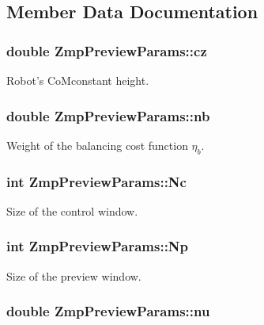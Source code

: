 \subsection{\-Member \-Data \-Documentation}
\hypertarget{structZmpPreviewParams_a4bddbdd99f911c9dddfcb2445da1b7dc}{
\subsubsection[{cz}]{\setlength{\rightskip}{0pt plus 5cm}double {\bf \-Zmp\-Preview\-Params\-::cz}}}\label{structZmpPreviewParams_a4bddbdd99f911c9dddfcb2445da1b7dc}
\-Robot's \-Co\-Mconstant height. \hypertarget{structZmpPreviewParams_abaa39df27b9d8993a940e753b297dcea}{
\subsubsection[{nb}]{\setlength{\rightskip}{0pt plus 5cm}double {\bf \-Zmp\-Preview\-Params\-::nb}}}\label{structZmpPreviewParams_abaa39df27b9d8993a940e753b297dcea}
\-Weight of the balancing cost function $ \eta_b $. \hypertarget{structZmpPreviewParams_adf022d12c133e9a17a41c1a9864fdef0}{
\subsubsection[{\-Nc}]{\setlength{\rightskip}{0pt plus 5cm}int {\bf \-Zmp\-Preview\-Params\-::\-Nc}}}\label{structZmpPreviewParams_adf022d12c133e9a17a41c1a9864fdef0}
\-Size of the control window. \hypertarget{structZmpPreviewParams_a04f1e9d5d0bd952d09187e3a67cdf33c}{
\subsubsection[{\-Np}]{\setlength{\rightskip}{0pt plus 5cm}int {\bf \-Zmp\-Preview\-Params\-::\-Np}}}\label{structZmpPreviewParams_a04f1e9d5d0bd952d09187e3a67cdf33c}
\-Size of the preview window. \hypertarget{structZmpPreviewParams_a3be5d92df5593e2a7c5694beaf912dac}{
\subsubsection[{nu}]{\setlength{\rightskip}{0pt plus 5cm}double {\bf \-Zmp\-Preview\-Params\-::nu}}}\label{structZmpPreviewParams_a3be5d92df5593e2a7c5694beaf912dac}
